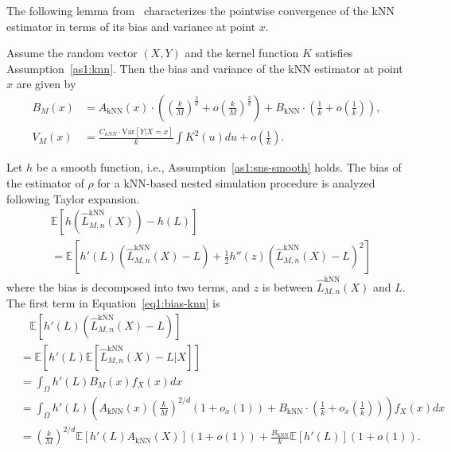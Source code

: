 The following lemma from~\cite{mack1981local} characterizes the pointwise convergence of the kNN estimator in terms of its bias and variance at point $x$.

\begin{lemma}
    Assume the random vector $(X, Y)$ and the kernel function $K$ satisfies Assumption~\ref{as1:knn}. Then the bias and variance of the kNN estimator at point $x$ are given by
    \begin{align*}
        B_M(x) & = A_{\text{kNN}}(x) \cdot \left( \left( \frac{k}{M} \right)^\frac{2}{d} + o \left( \frac{k}{M} \right)^\frac{2}{d} \right) + B_{\text{kNN}} \cdot \left(\frac{1}{k} + o\left(\frac{1}{k}\right)\right), \\
        V_M(x) & = \frac{C_{kNN} \cdot \text{Var}[Y| X = x]}{k} \int K^2(u) du + o\left(\frac{1}{k}\right).
    \end{align*}
\end{lemma}

Let $h$ be a smooth function, i.e., Assumption~\ref{as1:sns-smooth} holds.
The bias of the estimator of $\rho$ for a kNN-based nested simulation procedure is analyzed following Taylor expansion.
\begin{align} \label{eq1:bias-knn}
    & \mathbb{E} \left[ h(\hat{L}^{\text{kNN}}_{M, n}(X)) - h(L) \right] \nonumber \\
    & = \mathbb{E} \left[ h'(L) \left( \hat{L}^{\text{kNN}}_{M, n}(X) - L \right) + \frac{1}{2} h''(z) \left( \hat{L}^{\text{kNN}}_{M, n}(X) - L \right)^2 \right] 
\end{align}
where the bias is decomposed into two terms, and $z$ is between $\hat{L}^{\text{kNN}}_{M, n}(X)$ and $L$.
The first term in Equation~\ref{eq1:bias-knn} is 
\begin{align} \label{eq1:bias-knn-1}
    & ~~~~ \mathbb{E} \left[ h'(L) \left( \hat{L}^{\text{kNN}}_{M, n}(X) - L \right) \right]  \nonumber \\
    & = \mathbb{E} \left[ h'(L) \mathbb{E}\left[ \hat{L}^{\text{kNN}}_{M, n}(X) - L |X\right] \right] \nonumber \\
    & = \int_{\Omega} h'(L) B_M(x) f_X(x) dx \nonumber \\
    & = \int_{\Omega} h'(L) \left( A_{\text{kNN}}(x) \left(\frac{k}{M}\right)^{2/d} \left(1+o_x(1)\right) + B_{\text{kNN}} \cdot \left(\frac{1}{k} + o_x\left(\frac{1}{k}\right)\right) \right) f_X(x) dx \nonumber \\
    & = \left(\frac{k}{M}\right)^{2/d} \mathbb{E} \left[ h'(L) A_{\text{kNN}}(X) \right] (1+ o(1)) + \frac{B_{\text{kNN}}}{k} \mathbb{E} \left[ h'(L) \right] (1+ o(1)).
\end{align}

